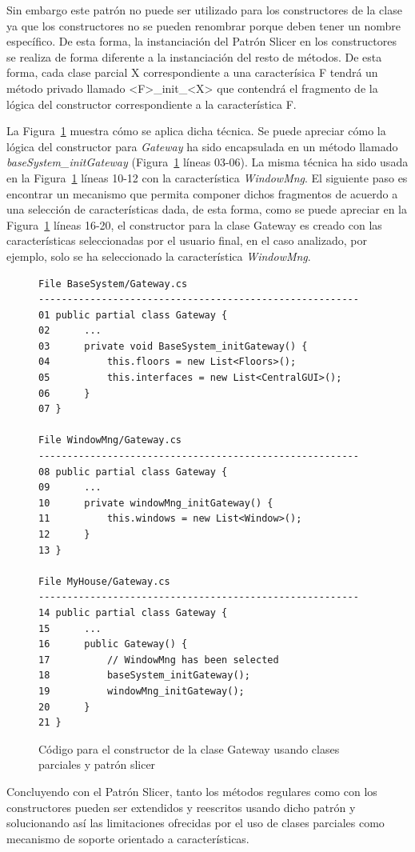 Sin embargo este patrón no puede ser utilizado para los constructores de la clase ya que los constructores no se pueden renombrar porque deben tener un nombre específico. De esta forma, la instanciación del Patrón Slicer en los constructores se realiza de forma diferente a la instanciación del resto de métodos. De esta forma, cada clase parcial X correspondiente a una caracterísica F tendrá un método privado llamado <F>\_init\_<X> que contendrá el fragmento de la lógica del constructor correspondiente a la característica F.

La Figura~\ref{back:code:constSlicerPattern} muestra cómo se aplica dicha técnica. Se puede apreciar cómo la lógica del constructor para \emph{Gateway} ha sido encapsulada en un método llamado  \emph{baseSystem\_initGateway} (Figura~\ref{back:code:constSlicerPattern} líneas 03-06). La misma técnica ha sido usada en la Figura~\ref{back:code:constSlicerPattern} líneas 10-12 con la característica \emph{WindowMng}. El siguiente paso es encontrar un mecanismo que permita componer dichos fragmentos de acuerdo a una selección de  características dada, de esta forma, como se puede apreciar en la Figura~\ref{back:code:constSlicerPattern} líneas 16-20, el constructor para la clase Gateway es creado con las características seleccionadas por el usuario final, en el caso analizado, por ejemplo, solo se ha seleccionado la característica \emph{WindowMng}.

\begin{figure}[tb!]
\begin{center}
\begin{footnotesize}
\begin{verbatim}
File BaseSystem/Gateway.cs
--------------------------------------------------------
01 public partial class Gateway {
02      ...
03      private void BaseSystem_initGateway() {
04          this.floors = new List<Floors>();
05          this.interfaces = new List<CentralGUI>();
06      }
07 }

File WindowMng/Gateway.cs
--------------------------------------------------------
08 public partial class Gateway {
09      ...
10      private windowMng_initGateway() {
11          this.windows = new List<Window>();
12      }
13 }

File MyHouse/Gateway.cs
--------------------------------------------------------
14 public partial class Gateway {
15      ...
16      public Gateway() {
17          // WindowMng has been selected
18          baseSystem_initGateway();
19          windowMng_initGateway();
20      }
21 }
\end{verbatim}
\end{footnotesize}
\end{center}
\caption{Código para el constructor de la clase Gateway usando clases parciales y patrón slicer}
\label{back:code:constSlicerPattern}
\end{figure}

Concluyendo con el Patrón Slicer, tanto los métodos regulares como con los constructores pueden ser extendidos y reescritos usando dicho patrón y solucionando así las limitaciones ofrecidas por el uso de clases parciales como mecanismo de soporte orientado a características.
